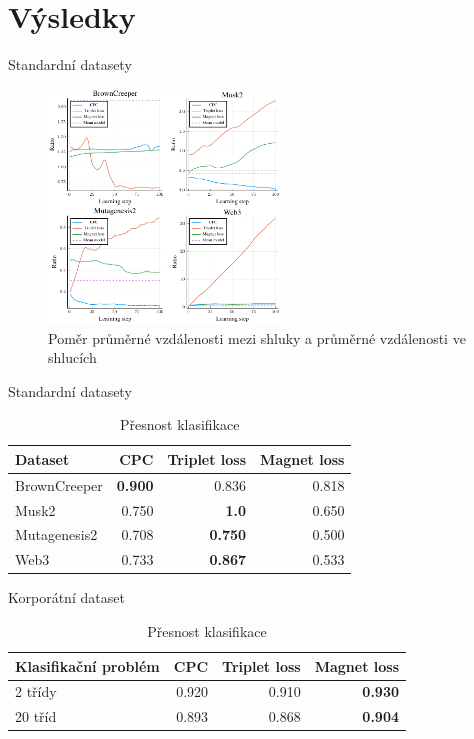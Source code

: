 \documentclass[10pt]{beamer}
\begin{document}
\section{Výsledky}

\begin{frame}{Standardní datasety}
	\begin{figure}[h]
		\centering
		\includegraphics[width=0.55\textwidth]{images/toy-ratio/toy-ratio.pdf}
		\caption{Poměr průměrné vzdálenosti mezi shluky a průměrné vzdálenosti ve shlucích}
	\end{figure}
\end{frame}

\begin{frame}{Standardní datasety}
  \begin{table}[h]
    \begin{tabular}{lrrr}
      \toprule
      Dataset          & CPC            & Triplet loss   & Magnet loss \\
      \midrule
      BrownCreeper     & \textbf{0.900} & 0.836          & 0.818 \\
      Musk2            & 0.750          & \textbf{1.0}   & 0.650 \\
      Mutagenesis2     & 0.708          & \textbf{0.750} & 0.500 \\
      Web3             & 0.733          & \textbf{0.867} & 0.533 \\
      \bottomrule
    \end{tabular}
    \caption{Přesnost klasifikace}
  \end{table}
\end{frame}

\begin{frame}{Korporátní dataset}
  \begin{table}
    \centering
    \begin{tabular}{lrrr}
      \toprule
      Klasifikační problém & CPC   & Triplet loss & Magnet loss \\
      \midrule
      2 třídy              & 0.920 & 0.910        & \textbf{0.930} \\
      20 tříd              & 0.893 & 0.868        & \textbf{0.904} \\
      \bottomrule
    \end{tabular}
    \caption{Přesnost klasifikace}\label{tab:cisco-accuracy}
  \end{table}
\end{frame}
\end{document}
